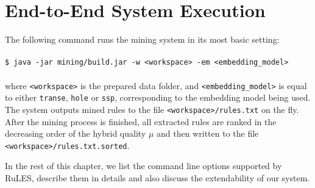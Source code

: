 \section{End-to-End System Execution}
The following command runs the mining system in its most basic setting:\\
\\
\texttt{\$ java -jar mining/build.jar -w <workspace> -em <embedding\_model>}\\
\\ 
where \texttt{<workspace>} is the prepared data folder, and \texttt{<embedding\_model>} is equal to either \texttt{transe}, \texttt{hole} or \texttt{ssp}, corresponding to the embedding model being used. The system outputs mined rules to the file \texttt{<workspace>/rules.txt} on the fly. After the mining process is finished, all extracted rules are ranked in the decreasing order of the hybrid quality $\mu$ and then written to the file \texttt{<workspace>/rules.txt.sorted}.

In the rest of this chapter, we list the command line options supported by RuLES, describe them in details and also discuss the extendability of our system.

